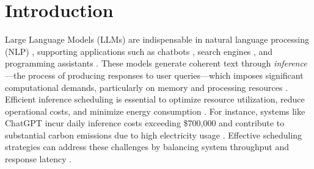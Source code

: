 \section{Introduction}

Large Language Models (LLMs) are indispensable in natural language processing (NLP) \citep{devlin2019bert, brown2020language, kaplan2020scaling, ouyang2022training, wei2022emergent, wei2022chain, touvron2023llama, openai2024gpt4technicalreport}, supporting applications such as chatbots \citep{anthropic2023claude, bai2023qwen, openai2024gpt4technicalreport, deepseekai2025deepseekr1incentivizingreasoningcapability}, search engines \citep{google2023bard, microsoft2023bing}, and programming assistants \citep{copilot, claude_3_7}. These models generate coherent text through \textit{inference}---the process of producing responses to user queries---which imposes significant computational demands, particularly on memory and processing resources \citep{garcia2019estimation}. Efficient inference scheduling is essential to optimize resource utilization, reduce operational costs, and minimize energy consumption \citep{strubell2019energy, desislavov2021compute}. For instance, systems like ChatGPT incur daily inference costs exceeding \$700,000 and contribute to substantial carbon emissions due to high electricity usage \citep{patel2023peeling, patterson2021carbon}. Effective scheduling strategies can address these challenges by balancing system throughput and response latency \citep{wu2022sustainable}.

